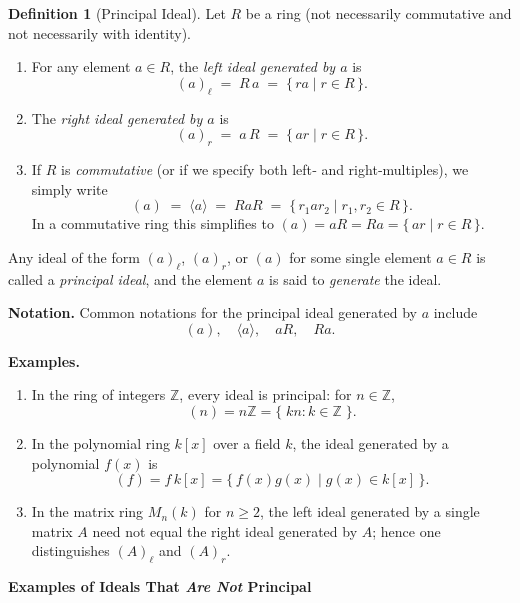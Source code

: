 \documentclass[12pt]{article}
\title{}
\author{Jerich Lee}
\date{\today}
\theoremstyle{definition} %
\newtheorem{definition}{Definition}
\theoremstyle{plain} %
\begin{document}
\maketitle
\begin{definition}[Principal Ideal]
  Let \(R\) be a ring (not necessarily commutative and not necessarily with identity).
  \begin{enumerate}
      \item For any element \(a\in R\), the \emph{left ideal generated by \(a\)} is
      \[
          (a)_\ell \;=\; R\,a \;=\; \{\,r a \mid r\in R \,\}.
      \]
      \item The \emph{right ideal generated by \(a\)} is
      \[
          (a)_r \;=\; a\,R \;=\; \{\,a r \mid r\in R \,\}.
      \]
      \item If \(R\) is \emph{commutative} (or if we specify both left‐ and right‐multiples), we simply write
      \[
          (a) \;=\; \langle a\rangle \;=\; R a R \;=\; \{\,r_1 a r_2 \mid r_1,r_2\in R \,\}.
      \]
      In a commutative ring this simplifies to \( (a)=aR = Ra=\{\,a r \mid r\in R \,\}. \)
  \end{enumerate}
  Any ideal of the form \((a)_\ell\), \((a)_r\), or \((a)\) for some single element \(a\in R\) is called a \emph{principal ideal}, and the element \(a\) is said to \emph{generate} the ideal.
  
  \smallskip
  \textbf{Notation.}  Common notations for the principal ideal generated by \(a\) include
  \[
      (a),\quad \langle a\rangle,\quad aR,\quad Ra.
  \]
  
  \smallskip
  \textbf{Examples.}
  \begin{enumerate}
      \item In the ring of integers \(\mathbb{Z}\), every ideal is principal: for \(n\in\mathbb{Z}\),
            \[
                (n)=n\mathbb{Z}=\{\;kn : k\in\mathbb{Z}\;\}.
            \]
      \item In the polynomial ring \(k[x]\) over a field \(k\), the ideal generated by a polynomial \(f(x)\) is
            \[
                (f)=f\,k[x]=\{\,f(x)g(x)\mid g(x)\in k[x]\,\}.
            \]
      \item In the matrix ring \(M_n(k)\) for \(n\ge 2\), the left ideal generated by a single matrix \(A\) need not equal the right ideal generated by \(A\); hence one distinguishes \((A)_\ell\) and \((A)_r\).
  \end{enumerate}
  \end{definition}
  \begin{center}
    \Large\textbf{Examples of Ideals That \emph{Are Not} Principal}
    \end{center}
    
\end{document}
